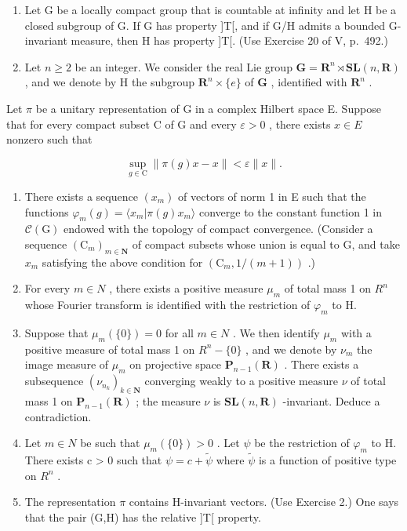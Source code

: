 \begin{enumerate}
\def\labelenumi{\arabic{enumi})}
\setcounter{enumi}{15}
\item
  Let G be a locally compact group that is countable at infinity and let H be a closed subgroup of G. If G has property ]T[, and if G/H admits a bounded G-invariant measure, then H has property ]T[. (Use Exercise 20 of V, p.~492.)
\item
  Let \(n \geqslant 2\) be an integer. We consider the real Lie group \(\mathbf{G} = \mathbf{R}^n \rtimes \mathbf{SL}(n, \mathbf{R})\) , and we denote by H the subgroup \(\mathbf{R}^n \times \{e\}\) of \(\mathbf{G}\) , identified with \(\mathbf{R}^n\) .
\end{enumerate}

Let \(\pi\) be a unitary representation of G in a complex Hilbert space E. Suppose that for every compact subset C of G and every \(\varepsilon > 0\) , there exists \(x \in E\) nonzero such that

\[
\sup _ {g \in \mathrm{C}} \| \pi (g) x - x \| <   \varepsilon \| x \|.
\]

\begin{enumerate}
\def\labelenumi{\alph{enumi})}
\item
  There exists a sequence \((x_{m})\) of vectors of norm 1 in E such that the functions \(\varphi_{m}(g)=\langle x_{m}|\pi(g)x_{m}\rangle\) converge to the constant function 1 in \(\mathcal{C}(\mathrm{G})\) endowed with the topology of compact convergence. (Consider a sequence \((\mathrm{C}_{m})_{m\in\mathbf{N}}\) of compact subsets whose union is equal to G, and take \(x_{m}\) satisfying the above condition for \((\mathrm{C}_{m},1/(m+1))\) .)
\item
  For every \(m \in N\) , there exists a positive measure \(\mu_{m}\) of total mass 1 on \(R^{n}\) whose Fourier transform is identified with the restriction of \(\varphi_{m}\) to H.
\item
  Suppose that \(\mu_{m}(\{0\}) = 0\) for all \(m \in N\) . We then identify \(\mu_{m}\) with a positive measure of total mass 1 on \(R^{n} - \{0\}\) , and we denote by \(\nu_{m}\) the image measure of \(\mu_{m}\) on projective space \(\mathbf{P}_{n-1}(\mathbf{R})\) . There exists a subsequence \((\nu_{n_{k}})_{k \in \mathbf{N}}\) converging weakly to a positive measure \(\nu\) of total mass 1 on \(\mathbf{P}_{n-1}(\mathbf{R})\) ; the measure \(\nu\) is \(\mathbf{SL}(n, \mathbf{R})\) -invariant. Deduce a contradiction.
\item
  Let \(m \in N\) be such that \(\mu_{m}(\{0\}) > 0\) . Let \(\psi\) be the restriction of \(\varphi_{m}\) to H. There exists c > 0 such that \(\psi = c + \widetilde{\psi}\) where \(\widetilde{\psi}\) is a function of positive type on \(R^{n}\) .
\item
  The representation \(\pi\) contains H-invariant vectors. (Use Exercise 2.) One says that the pair (G,H) has the relative ]T[ property.
\end{enumerate}

